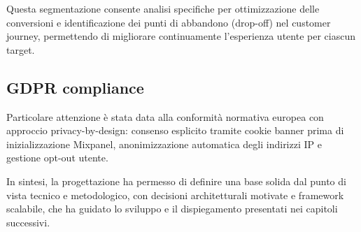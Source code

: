 Questa segmentazione consente analisi specifiche per ottimizzazione delle 
conversioni e identificazione dei punti di abbandono (drop-off) nel customer 
journey, permettendo di migliorare continuamente l'esperienza utente per 
ciascun target.

\subsection{GDPR compliance}
Particolare attenzione è stata data alla conformità normativa europea con 
approccio privacy-by-design: consenso esplicito tramite cookie banner prima 
di inizializzazione Mixpanel, anonimizzazione automatica degli indirizzi IP 
e gestione opt-out utente.

\bigskip
In sintesi, la progettazione ha permesso di definire una base solida dal punto di
vista tecnico e metodologico, con decisioni architetturali motivate e framework 
scalabile, che ha guidato lo sviluppo e il dispiegamento presentati nei capitoli 
successivi.